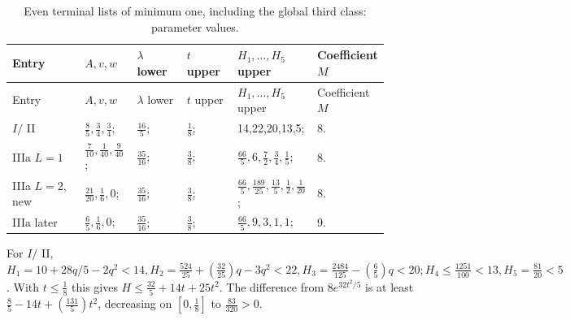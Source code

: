 \begingroup\small
\setlength{\tabcolsep}{3pt}
\setlength{\LTleft}{0pt}\setlength{\LTright}{\fill}
\begin{longtable}{@{}p{0.2200\linewidth}p{0.1400\linewidth}p{0.1400\linewidth}p{0.1400\linewidth}p{0.1400\linewidth}p{0.1400\linewidth}@{}}
\caption{Even terminal lists of minimum one, including the global third class: parameter values.}\label{tab:parameters:r2-c028:4}\\
\toprule
Entry & \(A,\allowbreak \allowbreak v,\allowbreak \allowbreak w\) & \(\lambda\) lower & \(t\) upper & \(H_{1},\allowbreak \allowbreak \ldots,\allowbreak \allowbreak H_{5}\) upper & Coefficient \(M\) \\
\midrule\endfirsthead
\toprule
Entry & \(A,\allowbreak \allowbreak v,\allowbreak \allowbreak w\) & \(\lambda\) lower & \(t\) upper & \(H_{1},\allowbreak \allowbreak \ldots,\allowbreak \allowbreak H_{5}\) upper & Coefficient \(M\) \\
\midrule\endhead
\bottomrule\endfoot
\(I/\) II & \(\frac{8}{5},\allowbreak \allowbreak \frac{3}{4},\allowbreak \allowbreak \frac{3}{4}\); & \(\frac{16}{5}\); & \(\frac{1}{8}\); & 14,22,20,13,5; & 8. \\
\addlinespace[2pt]
IIIa \(L=1\) & \(\frac{7}{10},\allowbreak \allowbreak \frac{1}{40},\allowbreak \allowbreak \frac{9}{40}\); & \(\frac{35}{16}\); & \(\frac{3}{8}\); & \(\frac{66}{5},\allowbreak \allowbreak 6,\allowbreak \allowbreak \frac{7}{2},\allowbreak \allowbreak \frac{3}{4},\allowbreak \allowbreak \frac{1}{5}\); & 8. \\
\addlinespace[2pt]
IIIa \(L=2\), new & \(\frac{21}{20},\allowbreak \allowbreak \frac{1}{6},\allowbreak \allowbreak 0\); & \(\frac{35}{16}\); & \(\frac{3}{8}\); & \(\frac{66}{5},\allowbreak \allowbreak \frac{189}{25},\allowbreak \allowbreak \frac{13}{5},\allowbreak \allowbreak \frac{1}{2},\allowbreak \allowbreak \frac{1}{20}\); & 8. \\
\addlinespace[2pt]
IIIa later & \(\frac{6}{5},\allowbreak \allowbreak \frac{1}{6},\allowbreak \allowbreak 0\); & \(\frac{35}{16}\); & \(\frac{3}{8}\); & \(\frac{66}{5},\allowbreak \allowbreak 9,\allowbreak \allowbreak 3,\allowbreak \allowbreak 1,\allowbreak \allowbreak 1\); & 9. \\
\end{longtable}
\endgroup


For \(I/\) II, \(H_{1}=10+28q/5-2q^2<14,\allowbreak \allowbreak  H_{2}=\frac{524}{25}+(\frac{32}{25})q-3q^2<22,\allowbreak \allowbreak H_{3}=\frac{2484}{125}-(\frac{6}{5})q<20; H_{4}\le \frac{1251}{100}<13,\allowbreak \allowbreak H_{5}=\frac{81}{20}<5\). With \(t\le \frac{1}{8}\) this gives \(H\le \frac{32}{5}+14t+25t^2\). The difference from \(8e^{32t^2/5}\) is at least \(\frac{8}{5}-14t+(\frac{131}{5})t^2\), decreasing on \([0,\allowbreak \allowbreak \frac{1}{8}]\) to \(\frac{83}{320}>0\).

